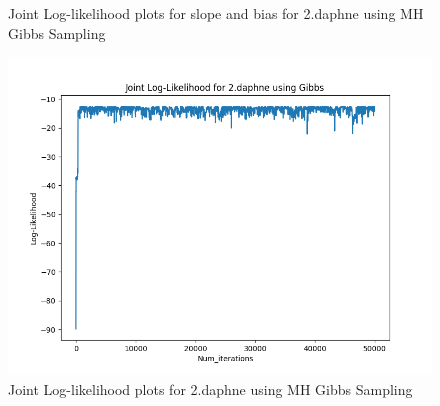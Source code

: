 \documentclass{article}
\begin{document}
\begin{enumerate}
\begin{enumerate}
\begin{figure}[!htp] 
    \centering
    \hfill%
        \caption{Joint Log-likelihood plots for slope and bias for 2.daphne using MH Gibbs Sampling}
\end{figure}

\begin{figure}[!ht]
	\centering
	\includegraphics[scale=0.5]{../figs/Gibbs/joint_log_likelihood_2_daphne}
	\caption{Joint Log-likelihood plots for 2.daphne using MH Gibbs Sampling}
\end{figure}


\end{enumerate}
\end{enumerate}
\end{document}
